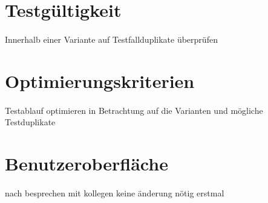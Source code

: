 \newpage
\section{Testgültigkeit}
\paragraph{}
Innerhalb einer Variante auf Testfallduplikate überprüfen

\newpage
\section{Optimierungskriterien}
\paragraph{}
Testablauf optimieren in Betrachtung auf die Varianten und mögliche Testduplikate

\newpage
\section{Benutzeroberfläche}
\paragraph{}


nach besprechen mit kollegen keine änderung nötig erstmal \\